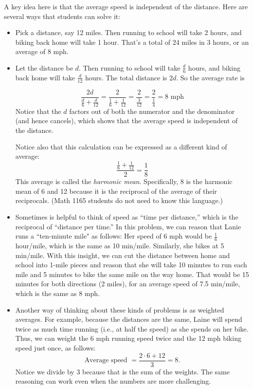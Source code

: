 \documentclass[nooutcomes]{ximera}
\begin{document}
\begin{teachingnote}
A key idea here is that the average speed is independent of the distance.  Here are several ways that students can solve it: 
\begin{itemize}
\item Pick a distance, say 12 miles.  Then running to school will take 2 hours, and biking back home will take 1 hour.  That's a total of 24 miles in 3 hours, or an average of 8 mph.  
\item Let the distance be $d$.  Then running to school will take $\frac{d}{6}$ hours, and biking back home will take $\frac{d}{12}$ hours.  The total distance is $2d$.  So the average rate is 

$$\frac{2d}{\frac{d}{6}+\frac{d}{12}}=\frac{2}{\frac{1}{6}+\frac{1}{12}}=\frac{2}{\frac{3}{12}}=\frac{2}{\frac{1}{4}}=8 \text{ mph}$$
Notice that the $d$ factors out of both the numerator and the denominator (and hence cancels), which shows that the average speed is independent of the distance.  

Notice also that this calculation can be expressed as a different kind of average:  $$\frac{\frac{1}{6}+\frac{1}{12}}{2}=\frac{1}{8}$$
This average is called the \emph{harmonic mean}.  Specifically, 8 is the harmonic mean of 6 and 12 because it is the reciprocal of the average of their reciprocals.  (Math 1165 students do not need to know this language.)
\item Sometimes is helpful to think of speed as ``time per distance,'' which is the reciprocal of ``distance per time.''  In this problem, we can reason that Lanie runs a ``ten-minute mile" as follows:  Her speed of 6 mph would be $\frac{1}{6}$ hour/mile, which is the same as 10 min/mile.  Similarly, she bikes at 5 min/mile.  With this insight, we can cut the distance between home and school into 1-mile pieces and reason that she will take 10 minutes to run each mile and 5 minutes to bike the same mile on the way home.  That would be 15 minutes for both directions (2 miles), for an average speed of 7.5 min/mile, which is the same as 8 mph.  
\item Another way of thinking about these kinds of problems is as weighted averages.  For example, because the distances are the same, Laine will spend twice as much time running (i.e., at half the speed) as she spends on her bike.  Thus, we can weight the 6 mph running speed twice and the 12 mph biking speed just once, as follows:  
$$\textrm{Average speed }= \frac{2\cdot6 + 12}{3} = 8.$$
Notice we divide by 3 because that is the sum of the weights.  The same reasoning can work even when the numbers are more challenging.  
\end{itemize}
\end{teachingnote}
\end{document}
